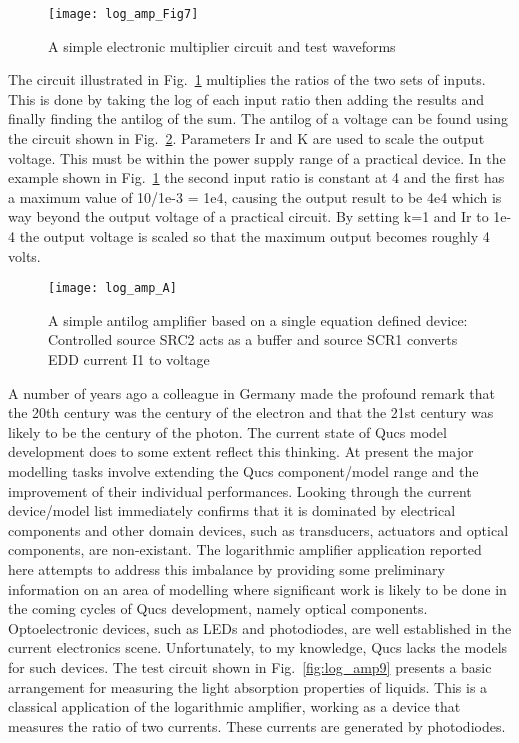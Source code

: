  \begin{figure} [h]
  \centering
  \texttt{[image: log\_amp\_Fig7]}
  \caption{A simple electronic multiplier circuit and test waveforms}
  \label{fig:log_amp7}
\end{figure} 
 
The circuit illustrated in Fig.~\ref{fig:log_amp7} multiplies the
ratios of the two sets of inputs.  This is done by taking the log of
each input ratio then adding the results and finally finding the
antilog of the sum. The antilog of a voltage can be found using the
circuit shown in Fig.~\ref{fig:log_ampA}. Parameters Ir and K are used
to scale the output voltage. This must be within the power supply
range of a practical device. In the example shown in
Fig.~\ref{fig:log_amp7} the second input ratio is constant at 4 and
the first has a maximum value of 10/1e-3 = 1e4, causing the output
result to be 4e4 which is way beyond the output voltage of a practical
circuit. By setting k=1 and Ir to 1e-4 the output voltage is scaled so
that the maximum output becomes roughly 4 volts.

 \begin{figure} [h]
  \centering
  \texttt{[image: log\_amp\_A]}
  \caption{A simple antilog amplifier based on a single equation defined device: Controlled source SRC2 acts as a buffer and source SCR1 converts EDD current I1 to voltage}
  \label{fig:log_ampA}
\end{figure} 


A number of years ago a colleague in Germany made the profound remark
that the 20th century was the century of the electron and that the
21st century was likely to be the century of the photon.  The current
state of Qucs model development does to some extent reflect this
thinking.  At present the major modelling tasks involve extending the
Qucs component/model range and the improvement of their individual
performances. Looking through the current device/model list
immediately confirms that it is dominated by electrical components and
other domain devices, such as transducers, actuators and optical
components, are non-existant. The logarithmic amplifier application
reported here attempts to address this imbalance by providing some
preliminary information on an area of modelling where significant work
is likely to be done in the coming cycles of Qucs development, namely
optical components. Optoelectronic devices, such as LEDs and
photodiodes, are well established in the current electronics
scene. Unfortunately, to my knowledge, Qucs lacks the models for such
devices. The test circuit shown in Fig.~\ref{fig:log_amp9} presents a
basic arrangement for measuring the light absorption properties of
liquids. This is a classical application of the logarithmic amplifier,
working as a device that measures the ratio of two currents. These
currents are generated by photodiodes.

